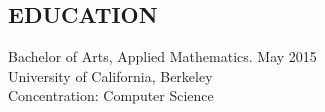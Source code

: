 \documentclass[margin, 8pt]{res} %
\begin{document}
\begin{resume}

 



\section{EDUCATION}

Bachelor of Arts, Applied Mathematics. May 2015\\
University of California, Berkeley \\
Concentration: Computer Science\\
 


 
 

\end{resume}
\end{document}
